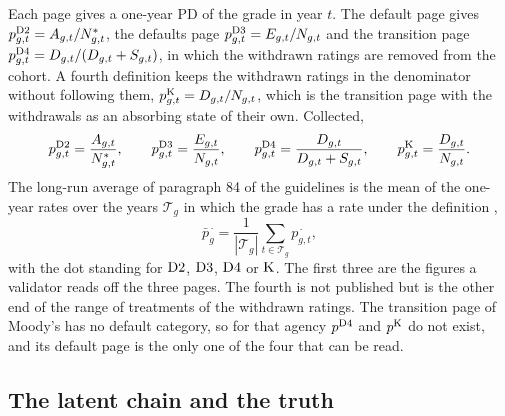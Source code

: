 Each page gives a one-year PD of the grade in year $t$. The default page gives $p^{\mathrm{D2}}_{g,t}=A_{g,t}/N^{\ast}_{g,t}$, the defaults page $p^{\mathrm{D3}}_{g,t}=E_{g,t}/N_{g,t}$ and the transition page $p^{\mathrm{D4}}_{g,t}=D_{g,t}/(D_{g,t}+S_{g,t})$, in which the withdrawn ratings are removed from the cohort. A fourth definition keeps the withdrawn ratings in the denominator without following them, $p^{\mathrm{K}}_{g,t}=D_{g,t}/N_{g,t}$, which is the transition page with the withdrawals as an absorbing state of their own. Collected, %
\begin{equation}
p^{\mathrm{D2}}_{g,t}=\frac{A_{g,t}}{N^{\ast}_{g,t}},\qquad
p^{\mathrm{D3}}_{g,t}=\frac{E_{g,t}}{N_{g,t}},\qquad
p^{\mathrm{D4}}_{g,t}=\frac{D_{g,t}}{D_{g,t}+S_{g,t}},\qquad
p^{\mathrm{K}}_{g,t}=\frac{D_{g,t}}{N_{g,t}}.
\label{eq:definitions}
\end{equation}
The long-run average of paragraph 84 of the guidelines is the mean of the one-year rates over the years $\mathcal T_g$ in which the grade has a rate under the definition \citep{EBA_2017},
\begin{equation}
\bar p^{\,\cdot}_{g}=\frac{1}{|\mathcal T_g|}\sum_{t\in\mathcal T_g}p^{\,\cdot}_{g,t},
\label{eq:lra}
\end{equation}
with the dot standing for $\mathrm{D2}$, $\mathrm{D3}$, $\mathrm{D4}$ or $\mathrm{K}$. The first three are the figures a validator reads off the three pages. The fourth is not published but is the other end of the range of treatments of the withdrawn ratings. The transition page of Moody's has no default category, so for that agency $p^{\mathrm{D4}}$ and $p^{\mathrm{K}}$ do not exist, and its default page is the only one of the four that can be read. %

\subsection{The latent chain and the truth}
\label{sec:problem-truth}


